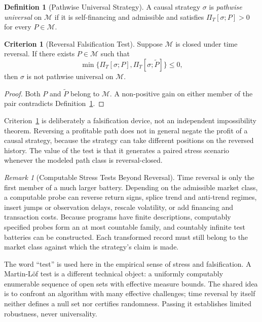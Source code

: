 \documentclass[aps,pra,reprint,superscriptaddress,amsmath,amssymb,floatfix]{revtex4-2}
\theoremstyle{plain}
\theoremstyle{definition}
\newtheorem{definition}{Definition}
\newtheorem{criterion}{Criterion}
\theoremstyle{remark}
\newtheorem{remark}{Remark}
\begin{document}
\begin{definition}[Pathwise Universal Strategy]
\label{def:universal}
  A causal strategy \(\sigma\) is \emph{pathwise universal} on
  \(\mathcal{M}\) if it is self-financing and admissible and satisfies
  \(\Pi_T[\sigma;P]>0\) for every \(P\in\mathcal{M}\).
\end{definition}

\begin{criterion}[Reversal Falsification Test]
  \label{crit:tr}
  Suppose \(\mathcal{M}\) is closed under time reversal. If there exists
  \(P\in\mathcal{M}\) such that
  \begin{equation}
    \min\{\Pi_T[\sigma;P],\Pi_T[\sigma;\widetilde P]\}\leq 0,
    \label{eq:reversaltest}
  \end{equation}
  then \(\sigma\) is not pathwise universal on \(\mathcal{M}\).
\end{criterion}

\begin{proof}
Both \(P\) and \(\widetilde P\) belong to \(\mathcal{M}\). A non-positive gain
on either member of the pair contradicts Definition~\ref{def:universal}.
\end{proof}

Criterion~\ref{crit:tr} is deliberately a falsification device, not an
independent impossibility theorem. Reversing a profitable path does not in
general negate the profit of a causal strategy, because the strategy can take
different positions on the reversed history. The value of the test is that it
generates a paired stress scenario whenever the modeled path class is
reversal-closed.

\begin{remark}[Computable Stress Tests Beyond Reversal]
\label{rem:stressfamily}
Time reversal is only the first member of a much larger battery. Depending on
the admissible market class, a computable probe can reverse return signs,
splice trend and anti-trend regimes, insert jumps or observation delays,
rescale volatility, or add financing and transaction costs. Because programs
have finite descriptions, computably specified probes form an at most
countable family, and countably infinite test batteries can be constructed.
Each transformed record must still belong to the market class against which
the strategy's claim is made.

The word ``test'' is used here in the empirical sense of stress and
falsification. A Martin-L\"of test is a different technical object: a uniformly
computably enumerable sequence of open sets with effective measure bounds.
The shared idea is to confront an algorithm with many effective challenges;
time reversal by itself neither defines a null set nor certifies randomness.
Passing it establishes limited robustness, never universality.
\end{remark}
\end{document}
